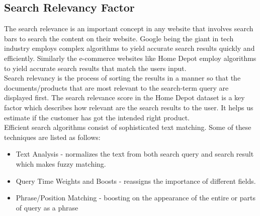 \documentclass{sig-alternate-05-2015}
\begin{document}
\subsection{Search Relevancy Factor}
The search relevance is an important concept in any website that involves search bars to search the content on their website. Google being the giant in tech industry employs complex algorithms to yield accurate search results quickly and efficiently. Similarly the e-commerce websites like Home Depot employ algorithms to yield accurate search results that match the users input.\\
Search relevancy is the process of sorting the results in a manner so that the documents/products that are most relevant to the search-term query are displayed first. The search relevance score in the Home Depot dataset \cite{www-homeDepo} is a key factor which describes how relevant are the search results to the user. It helps us estimate if the customer has got the intended right product. \\
Efficient search algorithms consist of sophisticated text matching.
\newline
Some of these techniques are listed as follows: 
\begin{itemize}
\item Text Analysis - normalizes the text from both search query and search result which makes fuzzy matching. 
\item Query Time Weights and Boosts - reassigns the importance of different fields. 
\item Phrase/Position Matching - boosting on the appearance of the entire or parts of query as a phrase \cite{www-opensourceconn}
\end{itemize}
\newline
\end{document}
